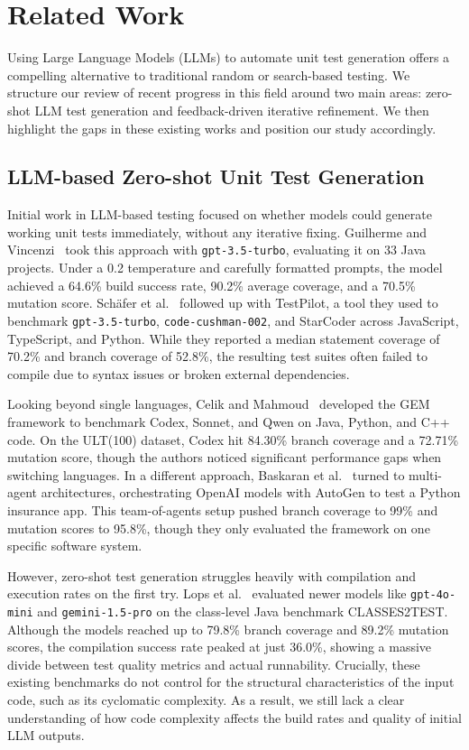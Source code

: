 \section{Related Work}
\label{sec:related_work}

Using Large Language Models (LLMs) to automate unit test generation offers a compelling alternative to traditional random or search-based testing. We structure our review of recent progress in this field around two main areas: zero-shot LLM test generation and feedback-driven iterative refinement. We then highlight the gaps in these existing works and position our study accordingly.

\subsection{LLM-based Zero-shot Unit Test Generation}
\label{subsec:zero_shot_gen}

Initial work in LLM-based testing focused on whether models could generate working unit tests immediately, without any iterative fixing. Guilherme and Vincenzi~\cite{guilherme2023sast} took this approach with \texttt{gpt-3.5-turbo}, evaluating it on 33 Java projects. Under a 0.2 temperature and carefully formatted prompts, the model achieved a 64.6\% build success rate, 90.2\% average coverage, and a 70.5\% mutation score. Sch{\"a}fer et al.~\cite{schafer2024testpilot} followed up with TestPilot, a tool they used to benchmark \texttt{gpt-3.5-turbo}, \texttt{code-cushman-002}, and StarCoder across JavaScript, TypeScript, and Python. While they reported a median statement coverage of 70.2\% and branch coverage of 52.8\%, the resulting test suites often failed to compile due to syntax issues or broken external dependencies.

Looking beyond single languages, Celik and Mahmoud~\cite{celik2026gem} developed the GEM framework to benchmark Codex, Sonnet, and Qwen on Java, Python, and C++ code. On the ULT(100) dataset, Codex hit 84.30\% branch coverage and a 72.71\% mutation score, though the authors noticed significant performance gaps when switching languages. In a different approach, Baskaran et al.~\cite{baskaran2025jucct} turned to multi-agent architectures, orchestrating OpenAI models with AutoGen to test a Python insurance app. This team-of-agents setup pushed branch coverage to 99\% and mutation scores to 95.8\%, though they only evaluated the framework on one specific software system.

However, zero-shot test generation struggles heavily with compilation and execution rates on the first try. Lops et al.~\cite{lops2025agonetest} evaluated newer models like \texttt{gpt-4o-mini} and \texttt{gemini-1.5-pro} on the class-level Java benchmark CLASSES2TEST. Although the models reached up to 79.8\% branch coverage and 89.2\% mutation scores, the compilation success rate peaked at just 36.0\%, showing a massive divide between test quality metrics and actual runnability. Crucially, these existing benchmarks do not control for the structural characteristics of the input code, such as its cyclomatic complexity. As a result, we still lack a clear understanding of how code complexity affects the build rates and quality of initial LLM outputs.


